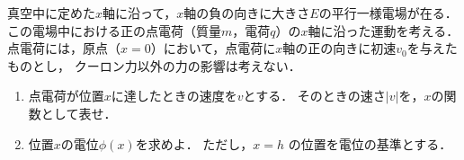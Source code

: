 ﻿\documentclass[../../../ps_q.tex]{subfiles}
\begin{document}
    真空中に定めた$x$軸に沿って，$x$軸の負の向きに大きさ$E$の平行一様電場が在る．
    この電場中における正の点電荷（質量$m$，電荷$q$）の$x$軸に沿った運動を考える．
    点電荷には，原点（$x=0$）において，点電荷に$x$軸の正の向きに初速$v_0$を与えたものとし，
    クーロン力以外の力の影響は考えない．

    \begin{enumerate}
        \item 点電荷が位置$x$に達したときの速度を$v$とする．
            そのときの速さ$|v|$を，$x$の関数として表せ．
        \item 位置$x$の電位$\phi(x)$を求めよ．
            ただし，$x=h$ の位置を電位の基準とする．
    \end{enumerate}
\end{document}
